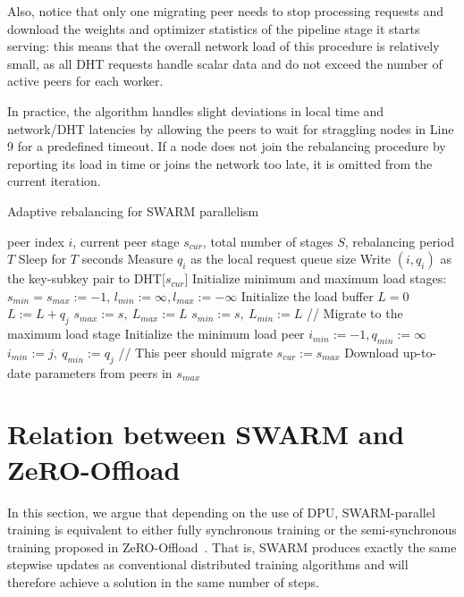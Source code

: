 Also, notice that only one migrating peer needs to stop processing requests and download the weights and optimizer statistics of the pipeline stage it starts serving: this means that the overall network load of this procedure is relatively small, as all DHT requests handle scalar data and do not exceed the number of active peers for each worker.

In practice, the algorithm handles slight deviations in local time and network/DHT latencies by allowing the peers to wait for straggling nodes in Line 9 for a predefined timeout. If a node does not join the rebalancing procedure by reporting its load in time or joins the network too late, it is omitted from the current iteration. 



\begin{algorithm}
  \caption{Adaptive rebalancing for SWARM parallelism}
  \label{alg:adaptive_rebalancing}
\begin{algorithmic}[1]
  \INPUT peer index $i$, current peer stage $s_{cur}$, total number of stages $S$, rebalancing period $T$
  \STATE Sleep for $T$ seconds
  \STATE Measure $q_i$ as the local request queue size
  \STATE Write $(i, q_i)$ as the key-subkey pair to DHT[$s_{cur}$]
  \STATE Initialize minimum and maximum load stages: $s_{min}=s_{max}:=-1$,
  \STATE $l_{min}:=\infty, l_{max}:=-\infty$
  \STATE Initialize the load buffer $L = 0$
  \STATE $L:=L+q_j$
  \ENDFOR 
  \STATE $s_{max}:=s,\ L_{max}:=L$
  \ENDIF
  \STATE $s_{min}:=s,\ L_{min}:=L$
  \ENDIF
  \ENDFOR
  \STATE // Migrate to the maximum load stage
  \STATE Initialize the minimum load peer $i_{min}:=-1,q_{min}:=\infty$
  \STATE $i_{min}:=j,\ q_{min}:=q_j$
  \ENDIF
  \ENDFOR
  \STATE // This peer should migrate
  \STATE $s_{cur}:=s_{max}$
  \STATE Download up-to-date parameters from peers in $s_{max}$
  \ENDIF
  \ENDIF
  \ENDWHILE
\end{algorithmic}
\end{algorithm}

\section{Relation between SWARM and ZeRO-Offload}\label{appendix:equivalence}
\vspace{2pt}

In this section, we argue that depending on the use of DPU, SWARM-parallel training is equivalent to either fully synchronous training or the semi-synchronous training proposed in ZeRO-Offload~\citep{zerooffload}.
That is, SWARM produces exactly the same stepwise updates as conventional distributed training algorithms and will therefore achieve a solution in the same number of steps.

